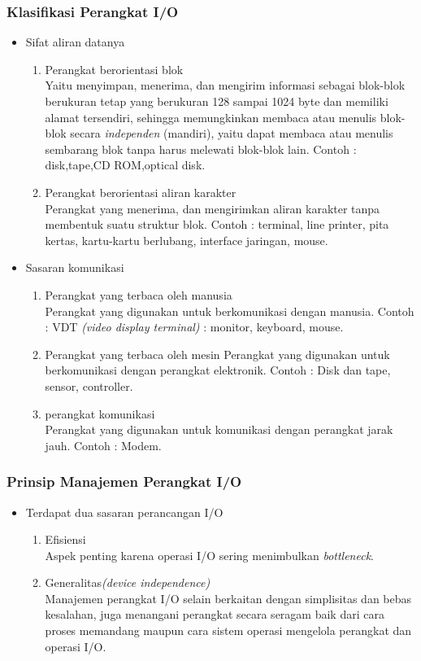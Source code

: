 \documentclass[12pt]{article}
\begin{document}
\subsubsection{Klasifikasi Perangkat I/O}
\begin{itemize}
    \item Sifat aliran datanya
\begin{enumerate}
    \item Perangkat berorientasi blok \\
    Yaitu menyimpan, menerima, dan mengirim informasi sebagai blok-blok berukuran tetap yang berukuran 128 sampai 1024 byte dan memiliki alamat tersendiri, sehingga memungkinkan membaca atau menulis blok-blok secara \textit{independen} (mandiri), yaitu dapat membaca atau menulis sembarang blok tanpa harus melewati blok-blok lain. Contoh : disk,tape,CD ROM,optical disk.
    \item Perangkat berorientasi aliran karakter \\
    Perangkat yang menerima, dan mengirimkan aliran karakter tanpa membentuk suatu struktur blok. Contoh : terminal, line printer, pita kertas, kartu-kartu berlubang, interface jaringan, mouse.
\end{enumerate}
\end{itemize}
\begin{itemize}
    \item Sasaran komunikasi 
\begin{enumerate}
    \item Perangkat yang terbaca oleh manusia \\
    Perangkat yang digunakan untuk berkomunikasi dengan manusia. 
    Contoh : VDT \textit{(video display terminal)} : monitor, keyboard, mouse.
    \item Perangkat yang terbaca oleh mesin 
    Perangkat yang digunakan untuk berkomunikasi dengan perangkat elektronik. Contoh : Disk dan tape, sensor, controller.
    \item perangkat komunikasi\\
    Perangkat yang digunakan untuk komunikasi dengan perangkat jarak jauh. Contoh : Modem.
\end{enumerate}
\end{itemize}
\subsubsection{Prinsip Manajemen Perangkat I/O}
\begin{itemize}
    \item Terdapat dua sasaran perancangan I/O
\begin{enumerate}
    \item Efisiensi \\
    Aspek penting karena operasi I/O sering menimbulkan \textit{bottleneck}.
    \item Generalitas\textit{(device independence)} \\
    Manajemen perangkat I/O selain berkaitan dengan simplisitas dan bebas kesalahan, juga menangani perangkat secara seragam baik dari cara proses memandang maupun cara sistem operasi mengelola perangkat dan operasi I/O.
\end{enumerate}
\end{itemize}
\end{document}
